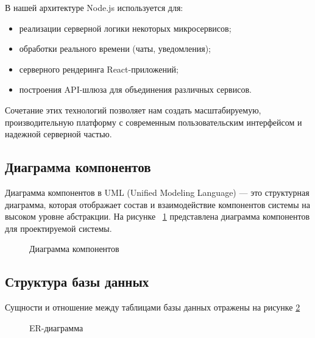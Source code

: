 В нашей архитектуре Node.js используется для:
\begin{itemize}
\item реализации серверной логики некоторых микросервисов;
\item обработки реального времени (чаты, уведомления);
\item серверного рендеринга React-приложений;
\item построения API-шлюза для объединения различных сервисов.
\end{itemize}

Сочетание этих технологий позволяет нам создать масштабируемую, производительную платформу с современным пользовательским интерфейсом и надежной серверной частью.

\subsection{Диаграмма компонентов}

Диаграмма компонентов в UML (Unified Modeling Language) — это структурная диаграмма, которая отображает состав и взаимодействие компонентов системы на высоком уровне абстракции. На рисунке  ~\ref{comp:image} представлена диаграмма компонентов для проектируемой системы.

\begin{figure}[H]
\caption{Диаграмма компонентов}
\label{comp:image}
\end{figure}

\subsection{Структура базы данных}

Сущности и отношение между таблицами базы данных отражены на рисунке \ref{place:image}

\begin{figure}[H]
\caption{ER-диаграмма}
\label{place:image}
\end{figure}

